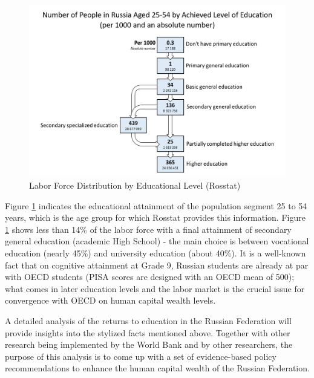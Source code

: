 \documentclass[alpha-refs]{wiley-article-01g}
\begin{document}
\vspace{-0.2in}

\begin{center}
	\begin{figure}[htbp!]
\begin{minipage}[b]{1\linewidth}
			\centering
			\hspace*{-0.7in}
			\includegraphics[width=5in]{graph_1c.png}
		\end{minipage}
			\caption{Labor Force Distribution by Educational Level (Rosstat)}\label{fig:1.1a}
	\end{figure}
\end{center}


\vspace{-2em}


Figure \ref{fig:1.1a} indicates the educational attainment of the population segment 25 to 54 years, which is the age group for which Rosstat provides this information. Figure \ref{fig:1.1a}  shows less than 14\% of the labor force with a final attainment of secondary general education (academic High School) - the main choice is between vocational education (nearly 45\%) and university education (about 40\%). It is a well-known fact that on cognitive attainment at Grade 9, Russian students are already at par with OECD students (PISA scores are designed with an OECD mean of 500); what comes in later education levels and the labor market is the crucial issue for convergence with OECD on human capital wealth levels. 

A detailed analysis of the returns to education in the Russian Federation will provide insights into the stylized facts mentioned above. Together with other research being implemented by the World Bank and by other researchers, the purpose of this analysis is to come up with a set of evidence-based policy recommendations to enhance the human capital wealth of the Russian Federation. 
\end{document}
